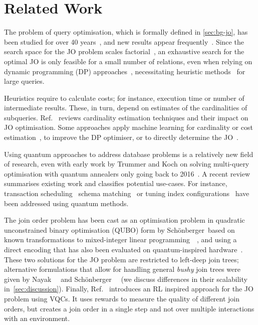 \documentclass[10pt, conference]{IEEEtran}
\begin{document}
\section{Related Work}\label{sec:rel-work}

The problem of query optimisation, which is formally defined in \autoref{sec:bg-jo}, has been studied for over 40 
years~\cite{selinger79}, and new results appear frequently~\cite{Leis.2018, Moerkotte.2020, neumann18, trummer17}.
Since the search space for the JO problem scales factorial~\cite{cluet95}, an exhaustive search for the optimal JO is only feasible for a small number of relations, even when relying on dynamic programming (DP) approaches~\cite{meister20, moerkotte06, selinger79, vance96, moerkotte08}, necessitating heuristic methods~\cite{steinbrunn97, horng94, bruno10, ioannidis90, swami89, trummer16a} for large queries.

Heuristics require to calculate costs; for instance, execution time or number of intermediate results. These, in turn, depend on estimates of the cardinalities of subqueries.
Ref.~\cite{han2021cardinality} reviews
cardinality estimation techniques and their impact on JO optimisation.
Some approaches apply machine learning for cardinality or cost estimation~\cite{kim2022,hasan2014,akdere2012learning}, to improve the DP optimiser, or to directly determine the JO~\cite{marcus18, krishnan18, xiang20, chen22, trummer21}.

Using quantum approaches to address database problems is a relatively new
field of research, even with early work by Trummer and Koch on solving multi-query
optimisation with quantum annealers only going back to 2016~\cite{trummer16}.
A recent review~\cite{winker:23:sigmodtutorial} summarises existing 
work and classifies potential use-cases. For instance, transaction
scheduling~\cite{groppe21, bittner20a, bittner20b, calikyilmaz23}
schema matching~\cite{Fritsch2023} or tuning index 
configurations~\cite{Gruenwald23} have been addressed 
using quantum methods. 

The join order problem has been cast as an optimisation problem in quadratic unconstrained binary optimisation (QUBO)
form by Schönberger~\etal based on known transformations to
mixed-integer linear programming~~\cite{schoenberger23}, and using a
direct encoding that has also been evaluated on quantum-inspired
hardware~\cite{schoenberger24}. These two solutions for the JO problem are restricted
to left-deep join trees; alternative formulations that allow for handling
general \emph{bushy} join trees were given by Nayak~\etal~\cite{nayak23} and 
Schönberger~\etal~\cite{schoenberger23:qdsm} (we discuss differences in
their scalability in~\autoref{sec:discussion}). Finally, Ref.~\cite{winker23}
introduces an RL inspired approach for the JO problem
using VQCs. It uses rewards to measure the quality of different join orders, but creates a join 
order in a single step and not over multiple interactions with an environment. 
\end{document}
